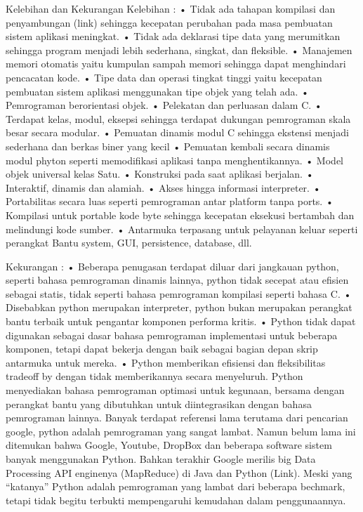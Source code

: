 Kelebihan dan Kekurangan
Kelebihan :
•	Tidak ada tahapan kompilasi dan penyambungan (link) sehingga kecepatan perubahan pada masa pembuatan sistem aplikasi meningkat.
•	Tidak ada deklarasi tipe data yang merumitkan sehingga program menjadi lebih sederhana, singkat, dan fleksible.
•	Manajemen memori otomatis yaitu kumpulan sampah memori sehingga dapat menghindari pencacatan kode.
•	Tipe data dan operasi tingkat tinggi yaitu kecepatan pembuatan sistem aplikasi menggunakan tipe objek yang telah ada.
•	Pemrograman berorientasi objek.
•	Pelekatan dan perluasan dalam C.
•	Terdapat kelas, modul, eksepsi sehingga terdapat dukungan pemrograman skala besar secara modular.
•	Pemuatan dinamis modul C sehingga ekstensi menjadi sederhana dan berkas biner yang kecil
•	Pemuatan kembali secara dinamis modul phyton seperti memodifikasi aplikasi tanpa menghentikannya.
•	Model objek universal kelas Satu.
•	Konstruksi pada saat aplikasi berjalan.
•	Interaktif, dinamis dan alamiah.
•	Akses hingga informasi interpreter.
•	Portabilitas secara luas seperti pemrograman antar platform tanpa ports.
•	Kompilasi untuk portable kode byte sehingga kecepatan eksekusi bertambah dan melindungi kode sumber.
•	Antarmuka terpasang untuk pelayanan keluar seperti perangkat Bantu system, GUI, persistence, database, dll.

Kekurangan :
•	Beberapa penugasan terdapat diluar dari jangkauan python, seperti bahasa pemrograman dinamis lainnya, python tidak secepat atau efisien sebagai statis, tidak seperti bahasa pemrograman kompilasi seperti bahasa C.
•	Disebabkan python merupakan interpreter, python bukan merupakan perangkat bantu terbaik untuk pengantar komponen performa kritis.
•	Python tidak dapat digunakan sebagai dasar bahasa pemrograman implementasi untuk beberapa komponen, tetapi dapat bekerja dengan baik sebagai bagian depan skrip antarmuka untuk mereka.
•	Python memberikan efisiensi dan fleksibilitas tradeoff by dengan tidak memberikannya secara menyeluruh. Python menyediakan bahasa pemrograman optimasi untuk kegunaan, bersama dengan perangkat bantu yang dibutuhkan untuk diintegrasikan dengan bahasa pemrograman lainnya.
Banyak terdapat referensi lama terutama dari pencarian google, python adalah pemrograman yang sangat lambat. Namun belum lama ini ditemukan bahwa Google, Youtube, DropBox dan beberapa software sistem banyak menggunakan Python. Bahkan terakhir Google merilis big Data Processing API enginenya (MapReduce) di Java dan Python (Link). Meski yang “katanya” Python adalah pemrograman yang lambat dari beberapa bechmark, tetapi tidak begitu terbukti mempengaruhi kemudahan dalam penggunaannya.
